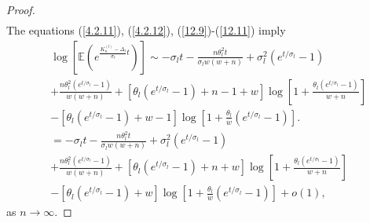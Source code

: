 \documentclass[12pt]{amsart}
\theoremstyle{definition}
\numberwithin{equation}{section}
\begin{document}
\begin{proof}
\begin{equation}
\begin{split}
\end{split}
\end{equation}
The equations (\ref{4.2.11}), (\ref{4.2.12}), (\ref{12.9})-(\ref{12.11}) imply
\begin{equation}\label{12.12}
\begin{split}
&\log\left[\mathbb{E}\left(e^{\frac{K_n^{(l)}-\Delta_l}{\sigma_l}t}\right)\right]
\sim-\sigma_l t-\frac{n\theta_l^2t}{\sigma_l w(w+n)}
+\sigma_l^2\left(e^{t/\sigma_l}-1\right)\\
&+\frac{n\theta_l^2\left(e^{t/\sigma_l}-1\right)}{w(w+n)}
+\left[\theta_l\left(e^{t/\sigma_l}-1\right)+n-1+w\right]
\log\left[1+\frac{\theta_l\left(e^{t/\sigma_l}-1\right)}{w+n}\right]\\
&-\left[\theta_l\left(e^{t/\sigma_l}-1\right)+w-1\right]
\log\left[1+\frac{\theta_l}{w}\left(e^{t/\sigma_l}-1\right)\right].\\
&=-\sigma_l t-\frac{n\theta_l^2t}{\sigma_l w(w+n)}
+\sigma_l^2\left(e^{t/\sigma_l}-1\right)\\
&+\frac{n\theta_l^2\left(e^{t/\sigma_l}-1\right)}{w(w+n)}
+\left[\theta_l\left(e^{t/\sigma_l}-1\right)+n+w\right]
\log\left[1+\frac{\theta_l\left(e^{t/\sigma_l}-1\right)}{w+n}\right]\\
&-\left[\theta_l\left(e^{t/\sigma_l}-1\right)+w\right]
\log\left[1+\frac{\theta_l}{w}\left(e^{t/\sigma_l}-1\right)\right]+o(1),
\end{split}
\end{equation}
as $n\rightarrow\infty$.


\end{proof}
\end{document}
